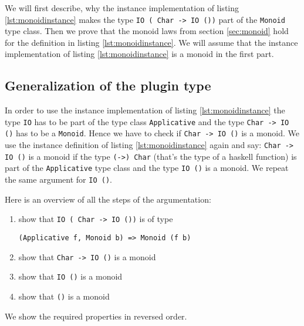 We will first describe, why the instance implementation of listing \ref{lst:monoidinstance} makes the type \verb|IO ( Char -> IO ())| part of the \verb|Monoid| type class. Then we prove that the monoid laws from section \ref{sec:monoid} hold for the definition in listing \ref{lst:monoidinstance}. We will assume that the instance implementation of listing \ref{lst:monoidinstance} is a monoid in the first part.

\subsection{Generalization of the plugin type }
\label{sec:generalization}

In order to use the instance implementation of listing \ref{lst:monoidinstance} the type \verb|IO| has to be part of the type class \verb|Applicative| and the type \verb|Char -> IO ()| has to be a \verb|Monoid|. 
Hence we have to check if \verb|Char -> IO ()| is a monoid. We use the instance definition of listing \ref{lst:monoidinstance} again and say: \verb|Char -> IO ()| is a monoid if the type \verb|(->) Char| (that's the type of a haskell function) is part of the \verb|Applicative| type class and the type \verb|IO ()| is a monoid. We repeat the same argument for \verb|IO ()|.

Here is an overview of all the steps of the argumentation:
\begin{enumerate}
\item show that  \verb|IO ( Char -> IO ())| is of type 
\begin{verbatim}
(Applicative f, Monoid b) => Monoid (f b)
\end{verbatim}
\item show that \verb|Char -> IO ()| is a monoid
\item show that \verb|IO ()| is a monoid
\item show that \verb|()| is a monoid
\end{enumerate}

We show the required properties in reversed order.

